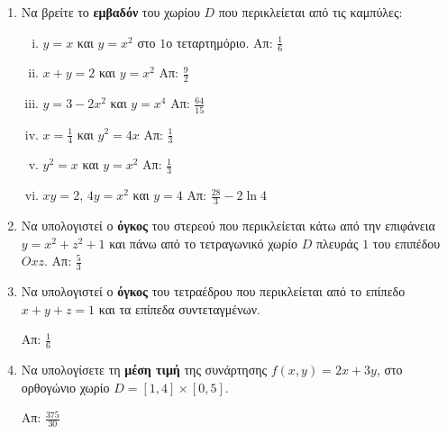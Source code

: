 \begin{enumerate}
  \item Να βρείτε το \textbf{εμβαδόν} του χωρίου $D$ που περικλείεται από τις καμπύλες: 
    \begin{enumerate}[i)]
      \item $y=x$ και $y=x^2$ στο $1$ο τεταρτημόριο. \hfill Απ: $\frac{1}{6}$
      \item $x+y=2$ και $y=x^2$ \hfill Απ: $\frac{9}{2}$
      \item $y=3-2x^2$ και $y=x^4$ \hfill Απ: $\frac{64}{15}$
      \item $x=\frac{1}{4}$ και $y^2=4x$ \hfill Απ: $\frac{1}{3}$ %
      \item $y^2=x$ και $y=x^2$ \hfill Απ: $\frac{1}{3}$ %
      \item $xy=2$, $4y=x^2$ και $y=4$ \hfill Απ: $\frac{28}{3}-2\ln 4$ 
    \end{enumerate}

  \item Να υπολογιστεί ο \textbf{όγκος} του στερεού που περικλείεται κάτω από 
    την επιφάνεια $y=x^2+z^2+1$ και πάνω από το τετραγωνικό χωρίο $D$ πλευράς $1$ 
    του επιπέδου $Oxz$.
    \hfill Απ: $\frac{5}{3}$ %

  \item Να υπολογιστεί ο \textbf{όγκος} του τετραέδρου που περικλείεται από το 
    επίπεδο $x+y+z=1$ και τα επίπεδα συντεταγμένων.  

    \hfill Απ: $\frac{1}{6}$ %


  \item Να υπολογίσετε τη \textbf{μέση τιμή} της συνάρτησης $ f(x,y)=2x+3y $, στο 
    ορθογώνιο χωρίο $D= [1,4] \times [0,5]$.

    \hfill Απ: $ \frac{375}{30} $ 
\end{enumerate}

\pagebreak

\begin{center}
  \minibox{\large\bf \textcolor{Col1}{Υποδείξεις}}
\end{center}

\vspace{\baselineskip}

